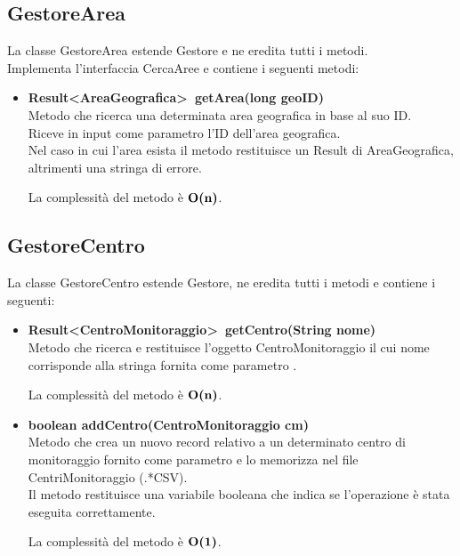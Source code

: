 \documentclass[a4paper, 12pt]{scrreprt}
\begin{document}
			\subsection{GestoreArea}
			La classe GestoreArea estende Gestore e ne eredita tutti i metodi.
			\\ Implementa l'interfaccia CercaAree e contiene i seguenti metodi:
			\begin{itemize}
				\item \textbf{Result\textless AreaGeografica\textgreater~getArea(long geoID)}
				\\Metodo che ricerca una determinata area geografica in base al suo ID.
				\\Riceve in input come parametro l'ID dell'area geografica.
				\\Nel caso in cui l'area esista il metodo restituisce un Result di AreaGeografica, altrimenti una stringa di errore.
				
				La complessit\`a del metodo \`e $\mathbf{O}\textbf{(n)}$.
			\end{itemize}

			\subsection{GestoreCentro}
			La classe GestoreCentro estende Gestore, ne eredita tutti i metodi e contiene i seguenti:
			\begin{itemize}
				\item \textbf{Result\textless CentroMonitoraggio\textgreater~getCentro(String nome)}
				\\Metodo che ricerca e restituisce l'oggetto CentroMonitoraggio il cui nome corrisponde alla stringa fornita come parametro .
				
				La complessit\`a del metodo \`e $\mathbf{O}\textbf{(n)}$.
				
				\item \textbf {boolean addCentro(CentroMonitoraggio cm)}
				\\Metodo che crea un nuovo record relativo a un determinato centro di monitoraggio fornito come parametro e lo memorizza nel file CentriMonitoraggio (.*CSV).
				\\Il metodo restituisce una variabile booleana che indica se l'operazione \`e stata eseguita correttamente.
				
				La complessit\`a del metodo \`e $\mathbf{O}\textbf{(1)}$.
			\end{itemize}
\end{document}

